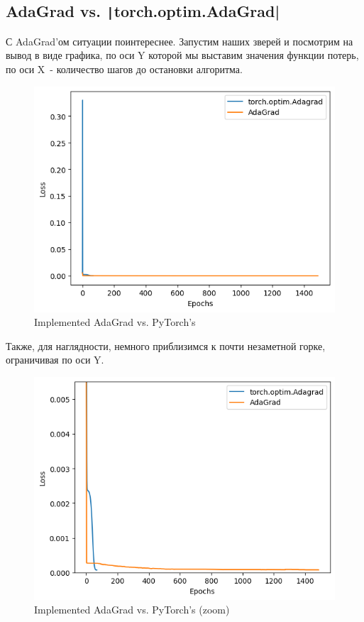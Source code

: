 \documentclass[12pt, a4paper, oneside, final]{article}
\begin{document}
	\subsection*{AdaGrad vs. \texttt|torch.optim.AdaGrad|}
	С AdaGrad'ом ситуации поинтереснее.
	Запустим наших зверей и посмотрим на вывод в виде графика, по оси Y которой мы выставим значения функции потерь, по оси X~- количество шагов до остановки алгоритма.
	\begin{figure}[H]
		\centering
		\includegraphics[scale = 1]{Image/T1_ADAGRAD_vs_torch_optim_AdaGrad.png}
		\caption*{Implemented AdaGrad vs. PyTorch's}
	\end{figure}
	Также, для наглядности, немного приблизимся к почти незаметной горке, ограничивая по оси Y.
	\begin{figure}[H]
		\centering
		\includegraphics[scale = 1]{Image/T1_ADAGRAD_vs_torch_optim_AdaGrad_ZOOM.png}
		\caption*{Implemented AdaGrad vs. PyTorch's (zoom)}
	\end{figure}
\end{document}
